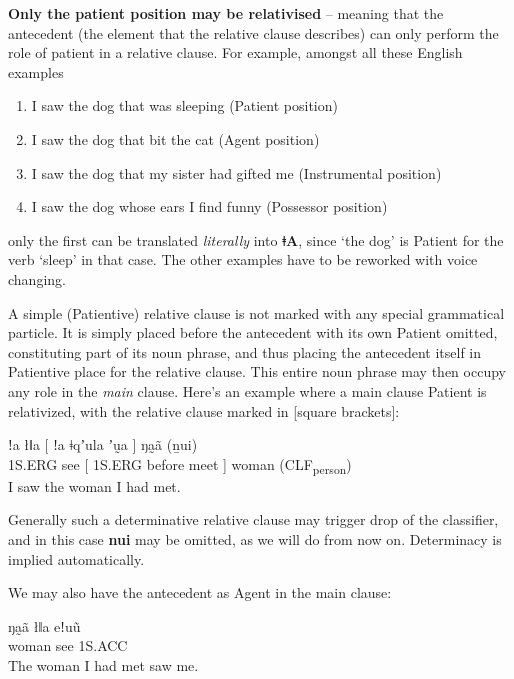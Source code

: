 \documentclass[11pt,a5paper]{book}
\newcommand{\qcn}[1]{\textcolor{AccentText}{\large\textbf{#1}}}
\newcommand{\langname}{\qcn{ǂA}}
\newcommand{\grammsc}[1]{\textsc{#1}}
\newcommand{\CLF}[1]{\grammsc{CLF}\textsubscript{#1}}
\newcommand{\ERG}{\grammsc{ERG}}
\newcommand{\ACC}{\grammsc{ACC}}
\begin{document}
\textbf{Only the patient position may be relativised} -- meaning that the antecedent (the element that the relative clause describes) can only perform the role of patient in a relative clause. For example, amongst all these English examples

\begin{enumerate}
\item I saw the dog that was sleeping (Patient position)
\item I saw the dog that bit the cat (Agent position)
\item I saw the dog that my sister had gifted me (Instrumental position)
\item I saw the dog whose ears I find funny (Possessor position)
\end{enumerate}

only the first can be translated \emph{literally} into \langname{}, since `the dog' is Patient for the verb `sleep' in that case. The other examples have to be reworked with voice changing.

A simple (Patientive) relative clause is not marked with any special grammatical particle. It is simply placed before the antecedent with its own Patient omitted, constituting part of its noun phrase, and thus placing the antecedent itself in Patientive place for the relative clause. This entire noun phrase may then occupy any role in the \emph{main} clause. Here's an example where a main clause Patient is relativized, with the relative clause marked in [square brackets]:

\begin{exe}
\ex
\gll ǃa łǁa [ ǃa ǂqʼula ʼṵa ] ŋa̰ã (ṉui) \\
1S.\ERG{} see [ 1S.\ERG{} before meet ] woman (\CLF{person}) \\
\glt I saw the woman I had met.
\end{exe}

Generally such a determinative relative clause may trigger drop of the classifier, and in this case \qcn{nui} may be omitted, as we will do from now on. Determinacy is implied automatically.

We may also have the antecedent as Agent in the main clause:

\begin{exe}
\ex
{} ŋa̰ã łǁa eǃuũ \\
[ 1S.\ERG{} before meet ] woman see 1S.\ACC{} \\
\glt The woman I had met saw me.
\end{exe}
\end{document}
